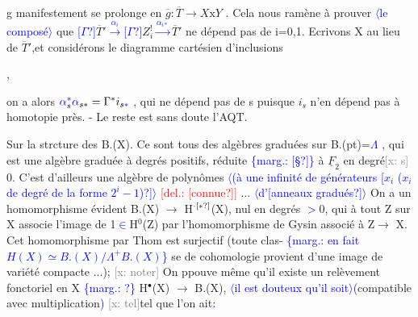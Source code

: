 \documentclass[11pt]{article}
\newcommand{\scanpage}[1]{\par\bigskip\noindent{\small\sffamily[scan #1]}\par}
\newcommand{\mspage}[1]{{\small\sffamily[p.\,#1]}}
\newcommand{\hand}[1]{\textcolor{blue}{#1}}
\let\over\relax
\newcommand{\over}[2]{\textcolor{gray}{#1}\textcolor{blue}{\ensuremath{^{\!\nearrow}}#2}}
\newcommand{\inserted}[2][]{\textcolor{blue}{$\langle$#2$\rangle$}}
\newcommand{\margin}[1]{\textcolor{blue}{\{\textsf{marg.:} #1\}}}
\newcommand{\deleted}[1]{\textcolor{red}{[\textsf{del.:} #1]}}
\newcommand{\xout}[1]{\textcolor{gray}{[\textsf{x:} #1]}}
\newcommand{\unsure}[1]{[#1?]}
\newenvironment{diagramblock}{\par\begin{center}}{\end{center}\par}
\begin{document}
\mspage{44}

\clearpage
\scanpage{162-5/45}
g manifestement se prolonge en $\overline{g} : \overline{T} \to X\mathrm{x}Y$ . Cela nous ramène à prouver
\inserted[typed]{le composé}
que \hand{\unsure{$\Gamma$}}$\overline{T}'$\hand{$\xrightarrow{\alpha_i}$}\hand{\unsure{$\Gamma$}}$Z_i^!$\hand{$\xrightarrow{\alpha_{i*}}$}$\overline{T}'$ ne dépend pas de i=0,1. Ecrivons X au lieu de $\overline{T}'$,et
considérons le diagramme cartésien d'inclusions
\begin{diagramblock}\end{diagramblock}
,

on a alors $\hand{\alpha}^{\hand{*}}_s \hand{\alpha}_{s*} = \Gamma^* i_{s\hand{*}}$ , qui ne dépend pas de s puisque $i_s$ n'en
dépend pas à homotopie près. - Le reste est sans doute l'AQT.

Sur la strcture des B.(X). Ce sont tous des algèbres graduées
sur B.(pt)=\hand{$\Lambda$} , qui est une algèbre graduée à degrés positifs, réduite
\margin{\unsure{\S}}
à $\underline{F}_2$ en degré\xout{s} 0. C'est d'ailleurs une algèbre de polynômes \inserted{(à une infinité de générateurs \unsure{$x_i$ ($x_i$ de degré de la forme $2^i-1$)}} \deleted{\unsure{connue}} ...
\inserted[typed]{d'\unsure{anneaux gradués}}
On a un homomorphisme évident B.(X) $\to$ H$^{\over{\cdot}{\unsure{*}}}$(X), nul en degrés \hand{$>$}0, qui
à tout Z sur X associe l'image de 1\hand{$\in$}H$^0$(Z) par l'homomorphisme de Gysin
associé à Z$\to$ X. Cet homomorphisme par Thom est surjectif (toute clas-%
\margin{en fait $H(X) \simeq B.(X)/\Lambda^+B.(X)$}
se de cohomologie provient d'une image de variété compacte ...); \xout{noter}
On ppouve même qu'il existe un relèvement fonctoriel en X
\margin{?}
H$^\bullet$(X) $\to$ B.(X), \inserted{il est douteux qu'il soit}\hand{(}compatible avec multiplication\hand{)} \xout{tel}tel que l'on ait\hand{:}
\end{document}
